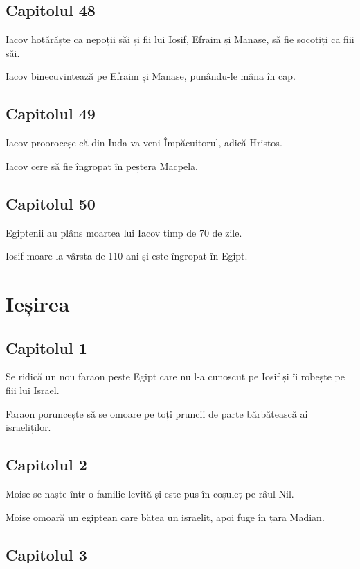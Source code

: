 \documentclass[12pt,a4paper]{article}
\begin{document}
\subsection{Capitolul 48}

Iacov hotărăște ca nepoții săi și fii lui Iosif, Efraim și Manase, să fie socotiți ca fiii săi.

Iacov binecuvintează pe Efraim și Manase, punându-le mâna în cap.

\subsection{Capitolul 49}

Iacov prooroceșe că din Iuda va veni Împăcuitorul, adică Hristos.

Iacov cere să fie îngropat în peștera Macpela.

\subsection{Capitolul 50}

Egiptenii au plâns moartea lui Iacov timp de 70 de zile.

Iosif moare la vârsta de 110 ani și este îngropat în Egipt.

\section{Ieșirea}

\subsection{Capitolul 1}

Se ridică un nou faraon peste Egipt care nu l-a cunoscut pe Iosif și îi robește pe fiii lui Israel.

Faraon poruncește să se omoare pe toți pruncii de parte bărbătească ai israeliților.

\subsection{Capitolul 2}

Moise se naște într-o familie levită și este pus în coșuleț pe râul Nil.

Moise omoară un egiptean care bătea un israelit, apoi fuge în țara Madian.

\subsection{Capitolul 3}
\end{document}
